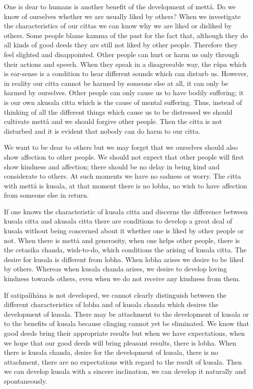 \documentclass[12pt,twoside]{article}
\begin{document}
{\textasciigrave}{\textasciigrave}One is dear to
humans{\textquotesingle}{\textquotesingle} is another benefit of the
development of mett{\aa}. Do we know of ourselves whether we are
usually liked by others? When we investigate the characteristics of our
cittas we can know why we are liked or disliked by others. Some people
blame kamma of the past for the fact that, although they do all kinds
of good deeds they are still not liked by other people. Therefore they
feel slighted and disappointed. Other people can hurt or harm us only
through their actions and speech. When they speak in a disagreeable
way, the r\'upa which is ear{}-sense is a condition to hear different
sounds which can disturb us. However, in reality our citta cannot be
harmed by someone else at all, it can only be harmed by ourselves.
Other people can only cause us to have bodily suffering; it is our own
akusala citta which is the cause of mental suffering. Thus, instead of
thinking of all the different things which cause us to be distressed we
should cultivate mett{\aa} and we should forgive other people. Then the
citta is not disturbed and it is evident that nobody can do harm to our
citta. 

We want to be dear to others but we may forget that we ourselves should
also show affection to other people. We should not expect that other
people will first show kindness and affection; there should be no delay
in being kind and considerate to others. At such moments we have no
sadness or worry. The citta with mett{\aa} is kusala, at that moment
there is no lobha, no wish to have affection from someone else in
return. 

If one knows the characteristic of kusala citta and discerns the
difference between kusala citta and akusala citta there are conditions
to develop a great deal of kusala without being concerned about it
whether one is liked by other people or not. When there is mett{\aa}
and generosity, when one helps other people, there is the cetasika
chanda,
{\textasciigrave}{\textasciigrave}wish{}-to{}-do{\textquotesingle}{\textquotesingle},
which conditions the arising of kusala citta. The desire for kusala is
different from lobha. When lobha arises we desire to be liked by
others. Whereas when kusala chanda arises, we desire to develop loving
kindness towards others, even when we do not receive any kindness from
them. 

If satipa\`i\`ih{\aa}na is not developed, we cannot clearly distinguish
between the different characteristics of lobha and of kusala chanda
which desires the development of kusala. There may be attachment to the
development of kusala or to the benefits of kusala because clinging
cannot yet be eliminated. We know that good deeds bring their
appropriate results but when we have expectations, when we hope that
our good deeds will bring pleasant results, there is lobha. When there
is kusala chanda, desire for the development of kusala, there is no
attachment, there are no expectations with regard to the result of
kusala. Then we can develop kusala with a sincere inclination, we can
develop it naturally and spontaneously. 
\end{document}
